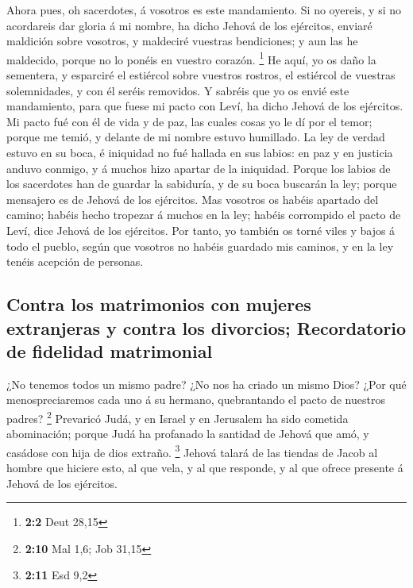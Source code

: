  Ahora pues, oh sacerdotes, á vosotros es este
mandamiento.  Si no oyereis, y si no acordareis dar gloria
á mi nombre, ha dicho Jehová de los ejércitos, enviaré maldición sobre
vosotros, y maldeciré vuestras bendiciones; y aun las he maldecido,
porque no lo ponéis en vuestro corazón. \footnote{\textbf{2:2} Deut
  28,15}  He aquí, yo os daño la sementera, y esparciré el
estiércol sobre vuestros rostros, el estiércol de vuestras solemnidades,
y con él seréis removidos.  Y sabréis que yo os envié este
mandamiento, para que fuese mi pacto con Leví, ha dicho Jehová de los
ejércitos.  Mi pacto fué con él de vida y de paz, las
cuales cosas yo le dí por el temor; porque me temió, y delante de mi
nombre estuvo humillado.  La ley de verdad estuvo en su
boca, é iniquidad no fué hallada en sus labios: en paz y en justicia
anduvo conmigo, y á muchos hizo apartar de la iniquidad. 
Porque los labios de los sacerdotes han de guardar la sabiduría, y de su
boca buscarán la ley; porque mensajero es de Jehová de los ejércitos.
 Mas vosotros os habéis apartado del camino; habéis hecho
tropezar á muchos en la ley; habéis corrompido el pacto de Leví, dice
Jehová de los ejércitos.  Por tanto, yo también os torné
viles y bajos á todo el pueblo, según que vosotros no habéis guardado
mis caminos, y en la ley tenéis acepción de personas.

\hypertarget{contra-los-matrimonios-con-mujeres-extranjeras-y-contra-los-divorcios-recordatorio-de-fidelidad-matrimonial}{%
\subsection{Contra los matrimonios con mujeres extranjeras y contra los
divorcios; Recordatorio de fidelidad
matrimonial}\label{contra-los-matrimonios-con-mujeres-extranjeras-y-contra-los-divorcios-recordatorio-de-fidelidad-matrimonial}}

 ¿No tenemos todos un mismo padre? ¿No nos ha criado un
mismo Dios? ¿Por qué menospreciaremos cada uno á su hermano,
quebrantando el pacto de nuestros padres? \footnote{\textbf{2:10} Mal
  1,6; Job 31,15}  Prevaricó Judá, y en Israel y en
Jerusalem ha sido cometida abominación; porque Judá ha profanado la
santidad de Jehová que amó, y casádose con hija de dios extraño.
\footnote{\textbf{2:11} Esd 9,2}  Jehová talará de las
tiendas de Jacob al hombre que hiciere esto, al que vela, y al que
responde, y al que ofrece presente á Jehová de los ejércitos.

